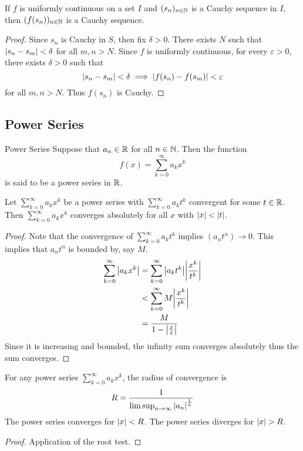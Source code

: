 \documentclass[a4paper]{article}
\begin{document}
\begin{thm}{}{} If $f$ is uniformly continuous on a set $I$ and $(s_n)_{n\in\mathbb{N}}$ is a Cauchy sequence in $I$, then $(f(s_n))_{n\in\mathbb{N}}$ is a Cauchy sequence. \tcbline
\begin{proof} Since $s_n$ is Cauchy in $S$, then fix $\delta>0$. There exists $N$ such that $\abs{s_n-s_m}<\delta$ for all $m,n>N$. Since $f$ is uniformly continuous, for every $\varepsilon>0$, there exists $\delta>0$ such that $$\abs{s_n-s_m}<\delta\implies\abs{f(s_n)-f(s_m)}<\varepsilon$$ for all $m,n>N$. Thus $f(s_n)$ is Cauchy. 
\end{proof}
\end{thm}

\subsection{Power Series}
\begin{defn}{Power Series}{} Suppose that $a_n\in\mathbb{R}$ for all $n\in\mathbb{N}$. Then the function $$f(x)=\sum_{k=0}^{\infty}a_kx^k$$ is said to be a power series in $\mathbb{R}$. 
\end{defn}

\begin{thm}{}{} Let $\sum_{k=0}^{\infty}a_kx^k$ be a power series with $\sum_{k=0}^{\infty}a_kt^k$ convergent for some $t\in\mathbb{R}$. Then $\sum_{k=0}^{\infty}a_kx^k$ converges absolutely for all $x$ with $\abs{x}<\abs{t}$. \tcbline
\begin{proof} Note that the convergence of $\sum_{k=0}^{\infty}a_kt^k$ implies $(a_nt^n)\to 0$. This implies that $a_nt^n$ is bounded by, say $M$. 
\begin{align*}
\sum_{k=0}^{\infty}\abs{a_kx^k}&=\sum_{k=0}^{\infty}\abs{a_kt^k}\abs{\frac{x^k}{t^k}}\\
&<\sum_{k=0}^{\infty}M\abs{\frac{x^k}{t^k}}\\
&=\frac{M}{1-\abs{\frac{x}{t}}}\\
\end{align*} Since it is increasing and bounded, the infinity sum converges absolutely thus the sum converges. 
\end{proof}
\end{thm}

\begin{thm}{}{} For any power series $\sum_{k=0}^\infty a_kx^k$, the radius of convergence is $$R=\frac{1}{\limsup_{n\to\infty}\abs{a_n}^{\frac{1}{n}}}$$ The power series converges for $\abs{x}<R$. The power series diverges for $\abs{x}>R$. \tcbline
\begin{proof} Application of the root test. 
\end{proof}
\end{thm}
\end{document}
